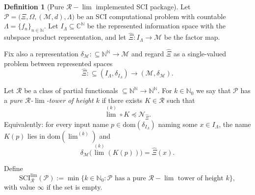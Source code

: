\documentclass{lmcs} %
\theoremstyle{plain}
\theoremstyle{plain}
\theoremstyle{definition}
\newtheorem{definition}[theorem]{Definition}
\theoremstyle{remark}
\theoremstyle{definition}
\theoremstyle{remark}
\numberwithin{equation}{section}
\newcommand{\NN}{\mathbb{N}}
\newcommand{\dom}{\mathrm{dom}}
\newcommand{\Lim}{\operatorname{lim}}
\newcommand{\Limi}[1]{\Lim^{(#1)}}
\begin{document}
\begin{definition}[Pure $\mathcal R-\Lim$ implemented SCI package]\label{def:SCIAR-package}
Let $\mathcal{P}=\bigl( \Xi,\Omega,(\mathcal{M},d),\Lambda \bigr)$ be an SCI computational problem with countable
$\Lambda=\{f_n\}_{n\in\NN}$. Let $I_\Lambda \subseteq \mathbb C^{\NN}$ be the
represented information space with the subspace product representation, and let
$\widehat{\Xi}:I_\Lambda \to \mathcal{M}$ be the factor map.

Fix also a representation $\delta_{\mathcal{M}}:\subseteq \mathbb N^{\mathbb N}\to \mathcal{M}$ and regard
$\widehat{\Xi}$ as a single-valued problem between represented spaces
\[
\widehat{\Xi}:\subseteq (I_\Lambda,\delta_{I_\Lambda}) \to (\mathcal{M},\delta_{\mathcal{M}}).
\]

Let $\mathcal R$ be a class of partial functionals
$\subseteq \mathbb N^{\mathbb N}\to \mathbb N^{\mathbb N}$.
For $k\in\mathbb N_0$ we say that $\mathcal{P}$ has a \textit{pure $\mathcal R$-$\Lim$-tower of
height $k$} if there exists $K\in\mathcal R$ such that
\[
\Limi{k} \circ K \preceq \mathcal N_{\widehat{\Xi}}.
\]
Equivalently: for every input name $p\in\dom(\delta_{I_\Lambda})$ naming some
$x\in I_\Lambda$, the name $K(p)$ lies in $\dom(\Limi{k})$ and
\[
\delta_{\mathcal{M}}\bigl( \Limi{k}(K(p)) \bigr)=\widehat{\Xi}(x).
\]

Define
\[
\mathrm{SCI}^{\Lim}_\mathcal R(\mathcal P) :=
\min\{k\in\mathbb N_0:
\mathcal P\text{ has a pure $\mathcal R-\Lim$ tower of height }k\},
\]
with value \(\infty\) if the set is empty.
\end{definition}
\end{document}
